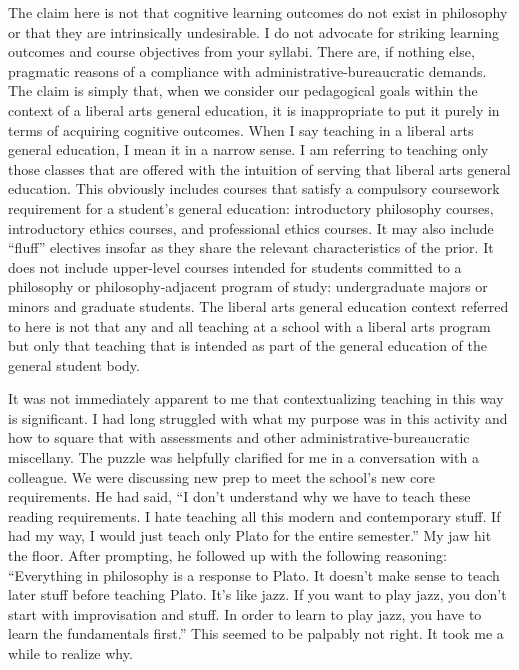 \documentclass[letterpaper,notitlepage,12pt]{article}
\begin{document}
The claim here is not that cognitive learning outcomes do not exist in
philosophy or that they are intrinsically undesirable.
I do not advocate for striking learning outcomes and course objectives from your
syllabi.
There are, if nothing else, pragmatic reasons of a compliance with
administrative-bureaucratic demands.
The claim is simply that, when we consider our pedagogical goals within the
context of a liberal arts general education, it is inappropriate to put it
purely in terms of acquiring cognitive outcomes.
When I say teaching in a liberal arts general education, I mean it in a narrow
sense.
I am referring to teaching only those classes that are offered with the
intuition of serving that liberal arts general education.
This obviously includes courses that satisfy a compulsory coursework requirement
for a student's general education: introductory philosophy courses, introductory
ethics courses, and professional ethics courses.
It may also include ``fluff'' electives insofar as they share the relevant
characteristics of the prior.
It does not include upper-level courses intended for students committed to a
philosophy or philosophy-adjacent program of study: undergraduate majors or
minors and graduate students.
The liberal arts general education context referred to here is not that any and
all teaching at a school with a liberal arts program but only that teaching that
is intended as part of the general education of the general student body.

It was not immediately apparent to me that contextualizing teaching in this way
is significant.
I had long struggled with what my purpose was in this activity and how to square
that with assessments and other administrative-bureaucratic miscellany.
The puzzle was helpfully clarified for me in a conversation with a colleague.
We were discussing new prep to meet the school's new core requirements.
He had said, ``I don't understand why we have to teach these reading
requirements.
I hate teaching all this modern and contemporary stuff.
If had my way, I would just teach only Plato for the entire semester.''
My jaw hit the floor.
After prompting, he followed up with the following reasoning: 
``Everything in philosophy is a response to Plato. 
It doesn't make sense to teach later stuff before teaching Plato. 
It's like jazz. 
If you want to play jazz, you don't start with improvisation and stuff.
In order to learn to play jazz, you have to learn the fundamentals first.''
This seemed to be palpably not right.
It took me a while to realize why.
\end{document}

